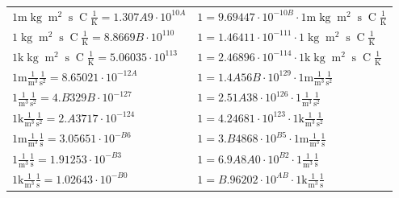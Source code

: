 \begin{center}
\begin{longtable}{l l}
{\color{gray}$1 \bm{\mathrm{ m}}\operatorname{kg}{\operatorname{m}^2}{\operatorname{s}}{\operatorname{C}}\frac1{\operatorname{K}} = 1.307A9\cdot10^{10A} $}   & {\color{gray}$ 1 = 9.69447\cdot10^{-10B} \cdot 1 \bm{\mathrm{ m}}\operatorname{kg}{\operatorname{m}^2}{\operatorname{s}}{\operatorname{C}}\frac1{\operatorname{K}}$}  \\
{\color{black}$1 \bm{\mathrm{ }}\operatorname{kg}{\operatorname{m}^2}{\operatorname{s}}{\operatorname{C}}\frac1{\operatorname{K}} = 8.8669B\cdot10^{110} $}   & {\color{black}$ 1 = 1.46411\cdot10^{-111} \cdot 1 \bm{\mathrm{ }}\operatorname{kg}{\operatorname{m}^2}{\operatorname{s}}{\operatorname{C}}\frac1{\operatorname{K}}$}  \\
{\color{gray}$1 \bm{\mathrm{ k}}\operatorname{kg}{\operatorname{m}^2}{\operatorname{s}}{\operatorname{C}}\frac1{\operatorname{K}} = 5.06035\cdot10^{113} $}   & {\color{gray}$ 1 = 2.46896\cdot10^{-114} \cdot 1 \bm{\mathrm{ k}}\operatorname{kg}{\operatorname{m}^2}{\operatorname{s}}{\operatorname{C}}\frac1{\operatorname{K}}$}  \\
\hline{\color{gray}$1 \bm{\mathrm{ m}}\frac1{\operatorname{m}^3}\frac1{\operatorname{s}^2}{}{} = 8.65021\cdot10^{-12A} $}   & {\color{gray}$ 1 = 1.4A56B\cdot10^{129} \cdot 1 \bm{\mathrm{ m}}\frac1{\operatorname{m}^3}\frac1{\operatorname{s}^2}{}{}$}  \\
{\color{black}$1 \bm{\mathrm{ }}\frac1{\operatorname{m}^3}\frac1{\operatorname{s}^2}{}{} = 4.B329B\cdot10^{-127} $}   & {\color{black}$ 1 = 2.51A38\cdot10^{126} \cdot 1 \bm{\mathrm{ }}\frac1{\operatorname{m}^3}\frac1{\operatorname{s}^2}{}{}$}  \\
{\color{gray}$1 \bm{\mathrm{ k}}\frac1{\operatorname{m}^3}\frac1{\operatorname{s}^2}{}{} = 2.A3717\cdot10^{-124} $}   & {\color{gray}$ 1 = 4.24681\cdot10^{123} \cdot 1 \bm{\mathrm{ k}}\frac1{\operatorname{m}^3}\frac1{\operatorname{s}^2}{}{}$}  \\
{\color{gray}$1 \bm{\mathrm{ m}}\frac1{\operatorname{m}^3}\frac1{\operatorname{s}}{}{} = 3.05651\cdot10^{-B6} $}   & {\color{gray}$ 1 = 3.B4868\cdot10^{B5} \cdot 1 \bm{\mathrm{ m}}\frac1{\operatorname{m}^3}\frac1{\operatorname{s}}{}{}$}  \\
{\color{black}$1 \bm{\mathrm{ }}\frac1{\operatorname{m}^3}\frac1{\operatorname{s}}{}{} = 1.91253\cdot10^{-B3} $}   & {\color{black}$ 1 = 6.9A8A0\cdot10^{B2} \cdot 1 \bm{\mathrm{ }}\frac1{\operatorname{m}^3}\frac1{\operatorname{s}}{}{}$}  \\
{\color{gray}$1 \bm{\mathrm{ k}}\frac1{\operatorname{m}^3}\frac1{\operatorname{s}}{}{} = 1.02643\cdot10^{-B0} $}   & {\color{gray}$ 1 = B.96202\cdot10^{AB} \cdot 1 \bm{\mathrm{ k}}\frac1{\operatorname{m}^3}\frac1{\operatorname{s}}{}{}$}  \\

\end{longtable}
\end{center}
